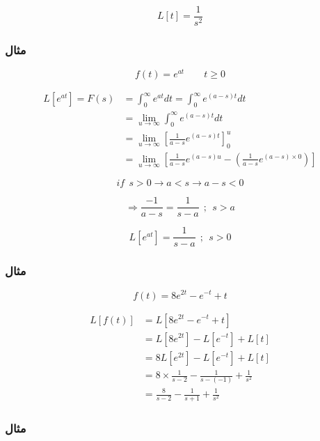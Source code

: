 \documentclass[12pt]{book}
\begin{document}
\begin{tcolorbox}
$$
L[t] = \frac{1}{s^{2}}
$$
\end{tcolorbox}



\subsubsection{مثال}


$$
f(t) = e^{at} \qquad t \geq 0
$$


\begin{align*}
L[e^{at}] = F(s) &= \int_{0}^{\infty}{e^{at} dt} = \int_{0}^{\infty}{e^{(a-s)t}dt} \\
&= \lim_{u \to \infty}{\int_{0}^{\infty}{e^{(a-s)t}dt}} \\
&= \lim_{u \to \infty}{\left[ \frac{1}{a-s} e^{(a-s)t} \right]_{0}^{u}}  \\
&= \lim_{u \to \infty}{\left[ \frac{1}{a-s} e^{(a-s)u} - \left( \frac{1}{a-s} e^{(a-s) \times 0} \right) \right]}
\end{align*}


$$
if \:\: s > 0 \to a < s \to a - s < 0 
$$

$$
\Rightarrow \frac{-1}{a-s} = \frac{1}{s-a} \:\: ; \:\: s > a
$$ 



\begin{tcolorbox}
$$
L \left[ e^{at} \right] = \frac{1}{s-a} \:\: ; \:\: s > 0
$$
\end{tcolorbox}



\subsubsection{مثال}

$$
f(t) = 8e^{2t} - e^{-t} + t 
$$

\begin{align*}
L[f(t)] &= L[8e^{2t} - e^{-t} + t] \\
&= L[8e^{2t}] - L[e^{-t}] + L[t] \\
&= 8 L[e^{2t}] - L[e^{-t}] + L[t] \\
&= 8 \times \frac{1}{s-2} - \frac{1}{s-(-1)} + \frac{1}{s^{2}} \\
&= \frac{8}{s-2} - \frac{1}{s+1} + \frac{1}{s^{2}}
\end{align*}




\subsubsection{مثال}
\end{document}
